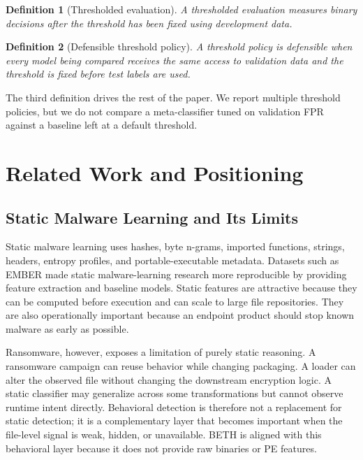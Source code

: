 \documentclass[10pt,journal,compsoc]{IEEEtran}
\newtheorem{definition}{Definition}
\begin{document}
\begin{definition}[Thresholded evaluation]
A thresholded evaluation measures binary decisions after the threshold has been fixed using development data.
\end{definition}

\begin{definition}[Defensible threshold policy]
A threshold policy is defensible when every model being compared receives the same access to validation data and the threshold is fixed before test labels are used.
\end{definition}

The third definition drives the rest of the paper. We report multiple threshold policies, but we do not compare a meta-classifier tuned on validation FPR against a baseline left at a default threshold.

\section{Related Work and Positioning}
\label{sec:related}

\subsection{Static Malware Learning and Its Limits}

Static malware learning uses hashes, byte n-grams, imported functions, strings, headers, entropy profiles, and portable-executable metadata. Datasets such as EMBER \cite{anderson2018} made static malware-learning research more reproducible by providing feature extraction and baseline models. Static features are attractive because they can be computed before execution and can scale to large file repositories. They are also operationally important because an endpoint product should stop known malware as early as possible.

Ransomware, however, exposes a limitation of purely static reasoning. A ransomware campaign can reuse behavior while changing packaging. A loader can alter the observed file without changing the downstream encryption logic. A static classifier may generalize across some transformations but cannot observe runtime intent directly. Behavioral detection is therefore not a replacement for static detection; it is a complementary layer that becomes important when the file-level signal is weak, hidden, or unavailable. BETH is aligned with this behavioral layer because it does not provide raw binaries or PE features.
\end{document}
